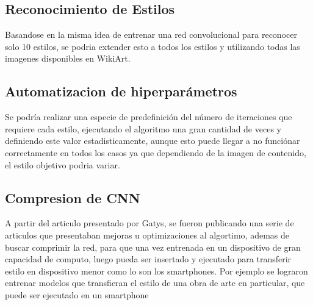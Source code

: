 \documentclass[a4paper,11pt,spanish]{book}
\begin{document}
    \subsection{Reconocimiento de Estilos}
      Basandose en la misma idea de entrenar una red convolucional para reconocer solo 10 estilos, se podria extender esto a todos los estilos y utilizando todas las imagenes disponibles
      en WikiArt.
    \subsection{Automatizacion de hiperparámetros}
      Se podría realizar una especie de predefinición del número de iteraciones que requiere cada estilo, ejecutando el algoritmo una gran cantidad de veces y definiendo este valor
      estadisticamente, aunque esto puede llegar a no funciónar correctamente en todos los casos ya que dependiendo de la imagen de contenido, el estilo objetivo podria variar.
    \subsection{Compresion de CNN}
      A partir del articulo presentado por Gatys, se fueron publicando una serie de articulos que presentaban mejoras u optimizaciones al algortimo, ademas de buscar comprimir la red,
      para que una vez entrenada en un dispositivo de gran capacidad de computo, luego pueda ser insertado y ejecutado para transferir estilo en dispositivo menor como lo son los smartphones.
      Por ejemplo se lograron entrenar modelos que transfieran el estilo de una obra de arte en particular, que puede ser ejecutado en un smartphone

\printindex

\end{document}
